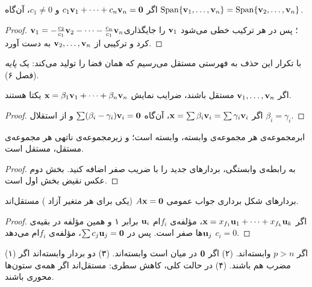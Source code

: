 \begin{theorem}\label{thm:remove-dependent}
اگر $c_1\mathbf{v}_1+\dots+c_n\mathbf{v}_n=\mathbf{0}$ و $c_1\neq0$، آن‌گاه
$\operatorname{Span}\{\mathbf{v}_1,\dots,\mathbf{v}_n\}=\operatorname{Span}\{\mathbf{v}_2,\dots,\mathbf{v}_n\}$.
\end{theorem}
\begin{proof}
$\mathbf{v}_1=-\frac{c_2}{c_1}\mathbf{v}_2-\dots-\frac{c_n}{c_1}\mathbf{v}_n$؛ پس در هر ترکیب خطی می‌شود $\mathbf{v}_1$ را جایگذاری کرد و ترکیبی از $\mathbf{v}_2,\dots,\mathbf{v}_n$ به دست آورد.
\end{proof}

با تکرار این حذف به فهرستی مستقل می‌رسیم که همان فضا را تولید می‌کند: یک \emph{پایه} (فصل ۶).

\begin{theorem}\label{thm:unique-coeffs}
اگر $\mathbf{v}_1,\dots,\mathbf{v}_n$ مستقل باشند، ضرایب نمایش $\mathbf{x}=\beta_1\mathbf{v}_1+\dots+\beta_n\mathbf{v}_n$ یکتا هستند.
\end{theorem}
\begin{proof}
اگر $\mathbf{x}=\sum\beta_i\mathbf{v}_i=\sum\gamma_i\mathbf{v}_i$، آن‌گاه $\sum(\beta_i-\gamma_i)\mathbf{v}_i=\mathbf{0}$ و از استقلال $\beta_i=\gamma_i$.
\end{proof}

\begin{theorem}\label{thm:subset-superset}
ابرمجموعه‌ی هر مجموعه‌ی وابسته، وابسته است؛ و زیرمجموعه‌ی ناتهی هر مجموعه‌ی مستقل، مستقل است.
\end{theorem}
\begin{proof}
به رابطه‌ی وابستگی، بردارهای جدید را با ضریب صفر اضافه کنید. بخش دوم عکس نقیض بخش اول است.
\end{proof}

\begin{theorem}\label{thm:null-vectors-indep}
بردارهای شکل برداری جواب عمومی $A\mathbf{x}=\mathbf{0}$ (یکی برای هر متغیر آزاد ) مستقل‌اند.
\end{theorem}
\begin{proof}
اگر $\mathbf{x}=x_{f_1}\mathbf{u}_1+\dots+x_{f_k}\mathbf{u}_k$، مؤلفه‌ی $f_i$ام $\mathbf{u}_i$ برابر ۱ و همین مؤلفه در بقیه‌ی $\mathbf{u}_j$ها صفر است. پس در $\sum c_j\mathbf{u}_j=\mathbf{0}$، مؤلفه‌ی $f_i$ام می‌دهد $c_i=0$.
\end{proof}

\begin{note}
(۱) اگر $p>n$ وابسته‌اند. (۲) اگر $\mathbf{0}$ در میان است وابسته‌اند. (۳) دو بردار وابسته‌اند اگر مضرب هم باشند. (۴) در حالت کلی، کاهش سطری: مستقل‌اند اگر همه‌ی ستون‌ها محوری باشند.
\end{note}

